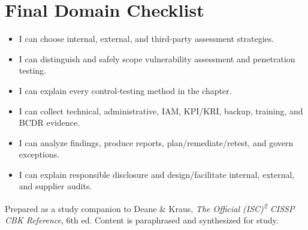 \documentclass[10pt,letterpaper]{article}
\begin{document}
\section{Final Domain Checklist}
\begin{itemize}[label=\(\square\)]
\item I can choose internal, external, and third-party assessment strategies.
\item I can distinguish and safely scope vulnerability assessment and penetration testing.
\item I can explain every control-testing method in the chapter.
\item I can collect technical, administrative, IAM, KPI/KRI, backup, training, and BCDR evidence.
\item I can analyze findings, produce reports, plan/remediate/retest, and govern exceptions.
\item I can explain responsible disclosure and design/facilitate internal, external, and supplier audits.
\end{itemize}
\vfill{\footnotesize\color{Teal}Prepared as a study companion to Deane \& Kraus, \textit{The Official (ISC)\textsuperscript{2} CISSP CBK Reference}, 6th ed. Content is paraphrased and synthesized for study.}
\end{document}
